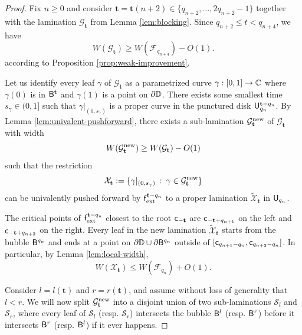 \documentclass{amsart}
\begin{document}
\begin{proof}
    Fix $n\geq 0$ and consider $\mathbf{t} = \mathbf{t}(n+2) \in \{q_{n+2},\ldots,2q_{n+2}-1\}$ together with the lamination $\mathcal{G}_{\mathbf{t}}$ from Lemma \ref{lem:blocking}. 
    Since $q_{n+2} \leq t< q_{n+4}$, we have
    \begin{equation}
    \label{eqn:n-to-t}
        W(\mathcal{G}_{\mathbf{t}}) \geq W(\mathcal{F}_{q_{n+4}}) - O(1).
    \end{equation}
    according to Proposition \ref{prop:weak-improvement}.
    
    Let us identify every leaf $\gamma$ of $\mathcal{G}_{\mathbf{t}}$ as a parametrized curve $\gamma: [0,1] \to \mathbb{C}$ where $\gamma(0)$ is in $\mathsf{B}^{\mathbf{t}}$ and $\gamma(1)$ is a point on $\partial \mathbb{D}$. 
    There exists some smallest time $s_\gamma \in (0,1]$ such that $\gamma|_{(0,s_\gamma)}$ is a proper curve in the punctured disk $\mathsf{U}^{{\mathbf{t}}-q_{n}}_{q_{n}}$. 
    By Lemma \ref{lem:univalent-pushforward}, there exists a sub-lamination $\mathcal{G}^{\textnormal{new}}_{\mathbf{t}}$ of $\mathcal{G}_{\mathbf{t}}$ with width
    \[
         W(\mathcal{G}^{\textnormal{new}}_{\mathbf{t}}) \geq W(\mathcal{G}_{\mathbf{t}}) - O(1)
    \]
    such that the restriction 
    \[
    \mathcal{X}_{\mathbf{t}} := \{\gamma|_{(0,s_\gamma)} \: : \: \gamma \in \mathcal{G}^{\textnormal{new}}_{\mathbf{t}}\}
    \]
    can be univalently pushed forward by $\mathsf{f}_{\textnormal{ext}}^{{\mathbf{t}}-q_{n}}$ to a proper lamination $\tilde{\mathcal{X}}_{\mathbf{t}}$ in $\mathsf{U}_{q_{n}}$.
    
    The critical points of $\mathsf{f}_{\textnormal{ext}}^{{\mathbf{t}}-q_{n}}$ closest to the root $\mathsf{c}_{-{\mathbf{t}}}$ are $\mathsf{c}_{-{\mathbf{t}}+q_{n+1}}$ on the left and $\mathsf{c}_{-{\mathbf{t}}+q_{n+2}}$ on the right. 
    Every leaf in the new lamination $\tilde{\mathcal{X}}_{\mathbf{t}}$ starts from the bubble $\mathsf{B}^{q_{n}}$ and ends at a point on $\partial \mathbb{D} \cup \partial \mathsf{B}^{q_n}$ outside of $[\mathsf{c}_{q_{n+1}-q_{n}},\mathsf{c}_{q_{n+2}-q_{n}}]$. 
    In particular, by Lemma \ref{lem:local-width},
    \[
        W(\mathcal{X}_{\mathbf{t}}) \leq W(\mathcal{F}_{q_{n}}) + O(1).
    \]

    Consider $l=l({\mathbf{t}})$ and $r=r({\mathbf{t}})$, and assume without loss of generality that $l<r$. 
    We will now split $\mathcal{G}^{\textnormal{new}}_{\mathbf{t}}$ into a disjoint union of two sub-laminations $\mathcal{S}_l$ and $\mathcal{S}_r$, where every leaf of $\mathcal{S}_l$ (resp. $\mathcal{S}_r$) intersects the bubble $\mathsf{B}^{l}$ (resp. $\mathsf{B}^r$) before it intersects $\mathsf{B}^r$ (resp. $\mathsf{B}^l$) if it ever happens. 


\end{proof}
\end{document}
